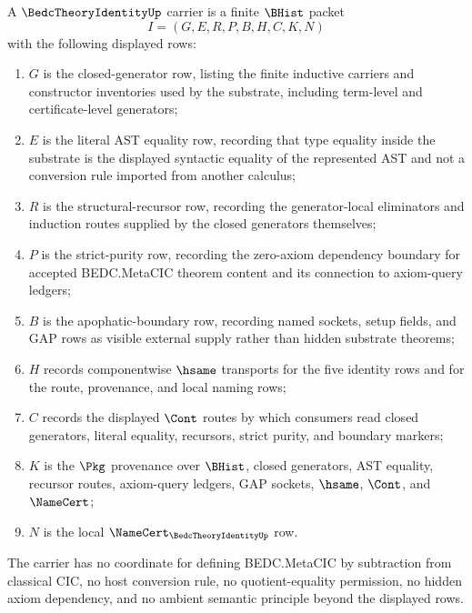 \begin{definition}
\label{def:bedc-theory-identity-carrier}
A $\BedcTheoryIdentityUp$ carrier is a finite $\BHist$ packet
$$
I=(G,E,R,P,B,H,C,K,N)
$$
with the following displayed rows:
\begin{enumerate}
\item $G$ is the closed-generator row, listing the finite inductive carriers and constructor inventories used by the substrate, including term-level and certificate-level generators;
\item $E$ is the literal AST equality row, recording that type equality inside the substrate is the displayed syntactic equality of the represented AST and not a conversion rule imported from another calculus;
\item $R$ is the structural-recursor row, recording the generator-local eliminators and induction routes supplied by the closed generators themselves;
\item $P$ is the strict-purity row, recording the zero-axiom dependency boundary for accepted BEDC.MetaCIC theorem content and its connection to axiom-query ledgers;
\item $B$ is the apophatic-boundary row, recording named sockets, setup fields, and GAP rows as visible external supply rather than hidden substrate theorems;
\item $H$ records componentwise $\hsame$ transports for the five identity rows and for the route, provenance, and local naming rows;
\item $C$ records the displayed $\Cont$ routes by which consumers read closed generators, literal equality, recursors, strict purity, and boundary markers;
\item $K$ is the $\Pkg$ provenance over $\BHist$, closed generators, AST equality, recursor routes, axiom-query ledgers, GAP sockets, $\hsame$, $\Cont$, and $\NameCert$;
\item $N$ is the local $\NameCert_{\BedcTheoryIdentityUp}$ row.
\end{enumerate}
The carrier has no coordinate for defining BEDC.MetaCIC by subtraction from classical CIC, no host conversion rule, no quotient-equality permission, no hidden axiom dependency, and no ambient semantic principle beyond the displayed rows.
\end{definition}

